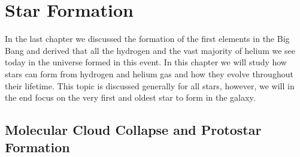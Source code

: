 
\chapter{Star Formation}\label{sec:star_formation}

In the last chapter we discussed the formation of the first elements in the Big Bang and derived that all the hydrogen and the vast majority of helium we see today in the universe formed in this event. In this chapter we will study how stars can form from hydrogen and helium gas and how they evolve throughout their lifetime. This topic is discussed generally for all stars, however, we will in the end focus on the very first and oldest star to form in the galaxy.

\section{Molecular Cloud Collapse and Protostar Formation}

